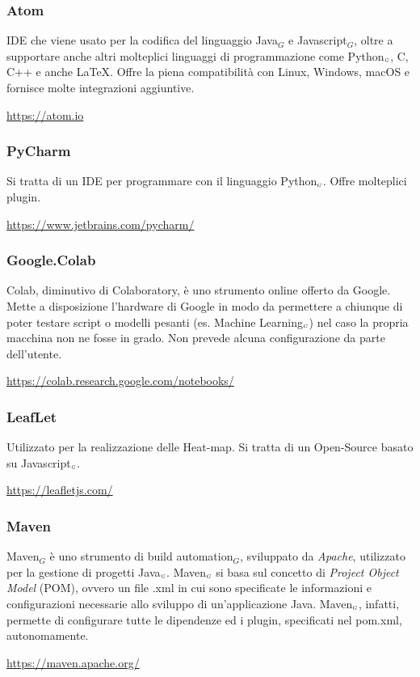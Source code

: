 \subsubsection{Atom}\label{ProcessiPrimariStrumentiAtom}
IDE che viene usato per la codifica del linguaggio Java$_G$ e Javascript$_G$, oltre a supportare anche altri molteplici linguaggi di programmazione come Python$_{\scaleto{G}{3pt}}$, C, C++ e anche \LaTeX. Offre la piena compatibilità con Linux, Windows, macOS e fornisce molte integrazioni aggiuntive.
\begin{center}
	\url{https://atom.io}
\end{center}
\subsubsection{PyCharm}\label{ProcessiPrimariStrumentiPyCharm}
Si tratta di un IDE per programmare con il linguaggio Python$_{\scaleto{G}{3pt}}$.
Offre molteplici plugin.
\begin{center}
	\url{https://www.jetbrains.com/pycharm/}
\end{center}
\subsubsection{Google.Colab}\label{ProcessiPrimariStrumentiGoogleColab}
Colab, diminutivo di Colaboratory, è uno strumento online offerto da Google.
Mette a disposizione l'hardware di Google in modo da permettere a chiunque di poter testare script o modelli pesanti (es. Machine Learning$_{\scaleto{G}{3pt}}$) nel caso la propria macchina non ne fosse in grado.
Non prevede alcuna configurazione da parte dell'utente.
\begin{center}
	\url{https://colab.research.google.com/notebooks/}
\end{center}
\subsubsection{LeafLet}\label{ProcessiPrimariStrumentiLeafLet}
Utilizzato per la realizzazione delle Heat-map.
Si tratta di un Open-Source basato su Javascript$_{\scaleto{G}{3pt}}$.
\begin{center}
	\url{https://leafletjs.com/}
\end{center}
\subsubsection{Maven} \label{ProcessiPrimariStrumentiMaven}
	Maven$_G$ è uno strumento di build automation$_G$, sviluppato da \textit{Apache}, utilizzato per la gestione di progetti Java$_{\scaleto{G}{3pt}}$. Maven$_{\scaleto{G}{3pt}}$ si basa sul concetto di \textit{Project Object Model} (POM), ovvero un file .xml in cui sono specificate le informazioni e configurazioni necessarie allo sviluppo di un'applicazione Java. Maven$_{\scaleto{G}{3pt}}$, infatti, permette di configurare tutte le dipendenze ed i plugin, specificati nel pom.xml, autonomamente.
	\begin{center}
		\url{https://maven.apache.org/}
	\end{center}
